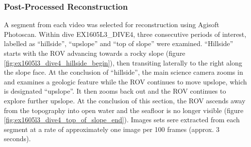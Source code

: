 \documentclass[letterpaper,12pt]{article}
\begin{document}
\subsubsection{Post-Processed Reconstruction}

A segment from each video was selected for reconstruction using Agisoft Photoscan.   Within dive EX1605L3\_DIVE4, three consecutive periods of interest, labelled as ``hillside'', ``upslope'' and ``top of slope'' were examined.   ``Hillside'' starts with the ROV advancing towards a rocky slope (figure \ref{fig:ex1605l3_dive4_hillside_begin}), then transiting laterally to the right along the slope face.  At the conclusion of ``hillside'', the main science camera zooms in and examines a geologic feature while the ROV continues to move upslope, which is designated ``upslope''.  It then zooms back out and the ROV continues to explore further upslope.  At the conclusion of this section, the ROV ascends away from the topography into open water and the seafloor is no longer visible (figure \ref{fig:ex1605l3_dive4_top_of_slope_end}).  Images sets sere extracted from each segment at a rate of approximately one image per 100 frames (approx. 3 seconds).
\end{document}
